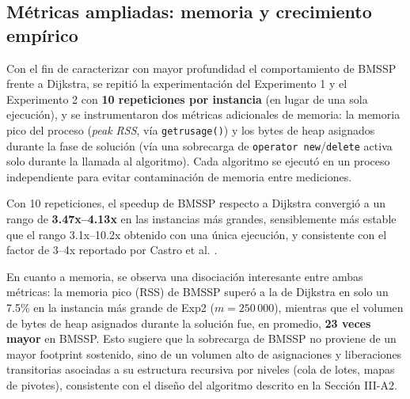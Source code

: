 
\subsection{M\'etricas ampliadas: memoria y crecimiento emp\'irico}

Con el fin de caracterizar con mayor profundidad el comportamiento de BMSSP
frente a Dijkstra, se repiti\'o la experimentaci\'on del Experimento 1 y el
Experimento 2 con \textbf{10 repeticiones por instancia} (en lugar de una sola
ejecuci\'on), y se instrumentaron dos m\'etricas adicionales de memoria: la
memoria pico del proceso (\emph{peak RSS}, v\'ia \texttt{getrusage()}) y los
bytes de heap asignados durante la fase de soluci\'on (v\'ia una sobrecarga de
\texttt{operator new}/\texttt{delete} activa solo durante la llamada al
algoritmo). Cada algoritmo se ejecut\'o en un proceso independiente para evitar
contaminaci\'on de memoria entre mediciones.

Con 10 repeticiones, el speedup de BMSSP respecto a Dijkstra convergi\'o a un
rango de \textbf{3.47x--4.13x} en las instancias m\'as grandes, sensiblemente
m\'as estable que el rango 3.1x--10.2x obtenido con una \'unica ejecuci\'on, y
consistente con el factor de 3--4x reportado por Castro et al.
\cite{implbmssp2025}.

En cuanto a memoria, se observa una disociaci\'on interesante entre ambas
m\'etricas: la memoria pico (RSS) de BMSSP super\'o a la de Dijkstra en solo un
7.5\% en la instancia m\'as grande de Exp2 ($m=250\,000$), mientras que el
volumen de bytes de heap asignados durante la soluci\'on fue, en promedio,
\textbf{23 veces mayor} en BMSSP. Esto sugiere que la sobrecarga de BMSSP no
proviene de un mayor footprint sostenido, sino de un volumen alto de
asignaciones y liberaciones transitorias asociadas a su estructura recursiva
por niveles (cola de lotes, mapas de pivotes), consistente con el dise\~no del
algoritmo descrito en la Secci\'on III-A2.

